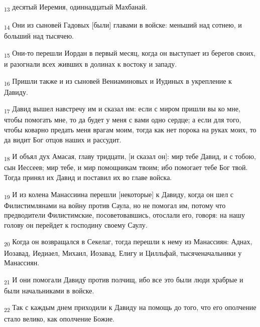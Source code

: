 \begin{tcolorbox}
\textsubscript{13} десятый Иеремия, одиннадцатый Махбанай.
\end{tcolorbox}
\begin{tcolorbox}
\textsubscript{14} Они из сыновей Гадовых [были] главами в войске: меньший над сотнею, и больший над тысячею.
\end{tcolorbox}
\begin{tcolorbox}
\textsubscript{15} Они-то перешли Иордан в первый месяц, когда он выступает из берегов своих, и разогнали всех живших в долинах к востоку и западу.
\end{tcolorbox}
\begin{tcolorbox}
\textsubscript{16} Пришли также и из сыновей Вениаминовых и Иудиных в укрепление к Давиду.
\end{tcolorbox}
\begin{tcolorbox}
\textsubscript{17} Давид вышел навстречу им и сказал им: если с миром пришли вы ко мне, чтобы помогать мне, то да будет у меня с вами одно сердце; а если для того, чтобы коварно предать меня врагам моим, тогда как нет порока на руках моих, то да видит Бог отцов наших и рассудит.
\end{tcolorbox}
\begin{tcolorbox}
\textsubscript{18} И объял дух Амасая, главу тридцати, [и сказал он]: мир тебе Давид, и с тобою, сын Иессеев; мир тебе, и мир помощникам твоим; ибо помогает тебе Бог твой. Тогда принял их Давид и поставил их во главе войска.
\end{tcolorbox}
\begin{tcolorbox}
\textsubscript{19} И из колена Манассиина перешли [некоторые] к Давиду, когда он шел с Филистимлянами на войну против Саула, но не помогал им, потому что предводители Филистимские, посоветовавшись, отослали его, говоря: на нашу голову он перейдет к господину своему Саулу.
\end{tcolorbox}
\begin{tcolorbox}
\textsubscript{20} Когда он возвращался в Секелаг, тогда перешли к нему из Манассиян: Аднах, Иозавад, Иедиаел, Михаил, Иозавад, Елигу и Цилльфай, тысяченачальники у Манассиян.
\end{tcolorbox}
\begin{tcolorbox}
\textsubscript{21} И они помогали Давиду против полчищ, ибо все это были люди храбрые и были начальниками в войске.
\end{tcolorbox}
\begin{tcolorbox}
\textsubscript{22} Так с каждым днем приходили к Давиду на помощь до того, что его ополчение стало велико, как ополчение Божие.
\end{tcolorbox}

